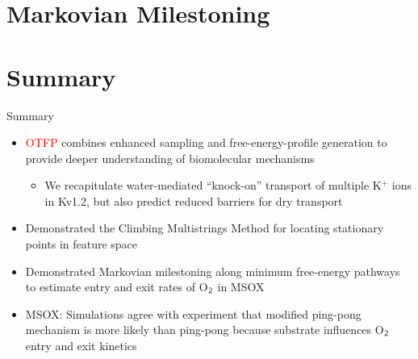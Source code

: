 \documentclass[10pt]{beamer}
\begin{document}


\section{Markovian Milestoning}



% 









% 







% 

\section{Summary}

\begin{frame}[fragile]{Summary}
  \begin{itemize}
  \item \textcolor{red}{OTFP} combines enhanced sampling and free-energy-profile generation to provide deeper understanding of biomolecular mechanisms
  \begin{itemize}
  \item We recapitulate water-mediated ``knock-on'' transport of multiple K$^+$ ions in Kv1.2, but also predict reduced barriers for dry transport
  \end{itemize}
  \item Demonstrated the \textcolor{magenta!80!black}{Climbing Multistrings Method} for locating stationary points in feature space
  \item Demonstrated \textcolor{green!80!black}{Markovian milestoning} along minimum free-energy pathways to estimate entry and exit rates of O$_{\sf 2}$ in MSOX
  \item MSOX: Simulations agree with experiment that modified ping-pong mechanism is more likely than ping-pong because substrate influences O$_{\sf 2}$ entry and exit kinetics
\end{itemize}
\end{frame}


\end{document}
